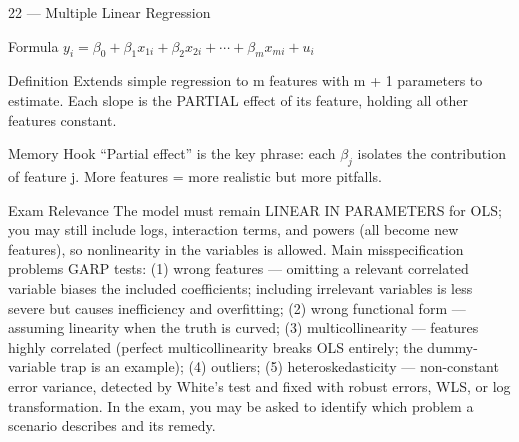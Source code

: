 \documentclass[aspectratio=169,8pt]{beamer}
\begin{document}
	\begin{frame}{22 --- Multiple Linear Regression}
		\begin{block}{Formula}
			$y_i = \beta_0 + \beta_1 x_{1i} + \beta_2 x_{2i} + \cdots + \beta_m x_{mi} + u_i$
		\end{block}
		\begin{block}{Definition}
			Extends simple regression to m features with m + 1 parameters to estimate. Each slope is the PARTIAL effect of its feature, holding all other features constant.
		\end{block}
		\begin{block}{Memory Hook}
			``Partial effect'' is the key phrase: each $\beta_j$ isolates the contribution of feature j. More features = more realistic but more pitfalls.
		\end{block}
		\begin{block}{Exam Relevance}
			The model must remain LINEAR IN PARAMETERS for OLS; you may still include logs, interaction terms, and powers (all become new features), so nonlinearity in the variables is allowed. Main misspecification problems GARP tests: (1) wrong features --- omitting a relevant correlated variable biases the included coefficients; including irrelevant variables is less severe but causes inefficiency and overfitting; (2) wrong functional form --- assuming linearity when the truth is curved; (3) multicollinearity --- features highly correlated (perfect multicollinearity breaks OLS entirely; the dummy-variable trap is an example); (4) outliers; (5) heteroskedasticity --- non-constant error variance, detected by White's test and fixed with robust errors, WLS, or log transformation. In the exam, you may be asked to identify which problem a scenario describes and its remedy.
		\end{block}
	\end{frame}
	
\end{document}
